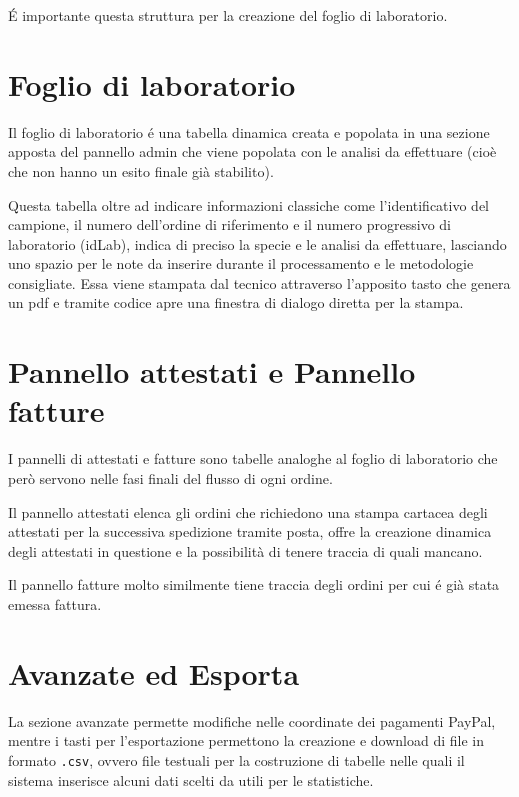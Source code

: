 É importante questa struttura per la creazione del \textsf{foglio di laboratorio}.

\section*{Foglio di laboratorio}
Il \textsf{foglio di laboratorio} é una tabella dinamica creata e popolata in una sezione apposta del pannello admin che viene popolata con le analisi da effettuare (cioè che non hanno un esito finale già stabilito).

Questa tabella oltre ad indicare informazioni classiche come l'identificativo del campione, il numero dell'ordine di riferimento e il numero progressivo di laboratorio (idLab), indica di preciso la specie e le analisi da effettuare, lasciando uno spazio per le note da inserire durante il processamento e le metodologie consigliate. Essa viene stampata dal tecnico attraverso l'apposito tasto che genera un pdf e tramite codice {\js} apre una finestra di dialogo diretta per la stampa.

\section*{Pannello attestati e Pannello fatture}
I pannelli di attestati e fatture sono tabelle analoghe al foglio di laboratorio che però servono nelle fasi finali del flusso di ogni ordine.

Il \textsf{pannello attestati} elenca gli ordini che richiedono una stampa cartacea degli attestati per la successiva spedizione tramite posta, offre la creazione dinamica degli attestati in questione e la possibilità di tenere traccia di quali mancano.

Il \textsf{pannello fatture} molto similmente tiene traccia degli ordini per cui é già stata emessa fattura.

\section*{Avanzate ed Esporta}
La sezione \textsf{avanzate} permette modifiche nelle coordinate dei pagamenti PayPal, mentre i tasti per l'\textsf{esportazione} permettono la creazione e download di file in formato \texttt{.csv}, ovvero file testuali per la costruzione di tabelle nelle quali il sistema inserisce alcuni dati scelti da {\fem} utili per le statistiche.